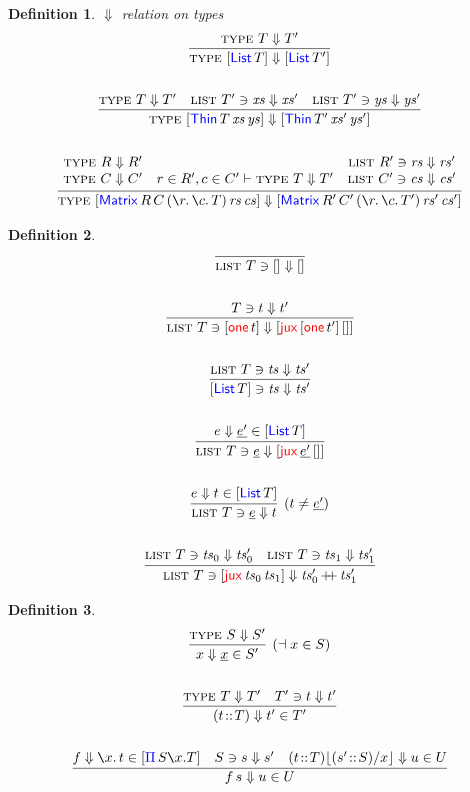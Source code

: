 \documentclass[12pt, a4paper]{article}
\makeatletter
\newcommand{\bsl}{\texttt{\symbol{92}}}
\newcommand{\Nil}{\mathbf{[]}}
\newcommand{\gp}{\,}
\newcommand{\forms}[3]{
  \ifthenelse{\equal{{#2}}{}}
  {\textcolor{#3}{\gp {#1}}}
  {[\textcolor{#3}{#1}\gp {#2}]}
}
\newcommand{\typeIntro}[2]{\forms{#1}{#2}{blue}}
\newcommand{\subst}[2]{{#1}\lfloor {#2} \rfloor}
\newcommand{\substfor}[3]{\subst{#1}{ {#2} / {#3} }}
\newcommand{\C}[1]{\textcolor{red}{\mathsf{#1}}}
\newcommand{\D}[1]{\textcolor{blue}{\mathsf{#1}}}
\newcommand{\one}[1]{[ \C{one} \gp  {#1} ]}
\newcommand{\List}[1]{[ \D{List} \gp {#1} ]}
\newcommand{\Matrix}[7]{[ \D{Matrix} \gp {#1} \gp {#2} \gp ( \la{#3}\la{#4} {#5}) \gp {#6} \gp {#7}]}
\newcommand{\MRCT}[2]{\Matrix{R}{C}{r}{c}{T}{#1}{#2}}
\newcommand{\jux}[2]{[ \C{jux} \gp {#1} \gp {#2}]}
\newcommand{\Thin}[3]{[ \D{Thin} \gp {#1} \gp {#2} \gp {#3} ]}
\newcommand{\synthType}[2]{{#1} \in {#2}}
\newcommand{\ctxSays}[1]{\dashv {#1}}
\newcommand{\rad}[2]{({#1} \!::\! {#2})}
\newcommand{\neu}[1]{\underline{#1}}
\newcommand{\la}[1]{\bsl{#1}.\,}
\newcommand{\V}[1]{\mathit{#1}}
\newcommand{\dplus}{\mathop{+\!\!+}}
\newcommand{\steps}{\Downarrow}
\newcommand{\typesteps}[2]{\textsc{type} \gp \gp {#1} \steps {#2}}
\newcommand{\liststeps}[3]{\textsc{list} \gp \gp {#1} \ni {#2} \steps {#3}}
\newcommand{\chksteps}[3]{{#1} \ni {#2} \steps {#3}}
\newcommand{\synsteps}[3]{{#1} \steps {#2} \in {#3}}
\newtheorem{dfn}{Definition}
\newcommand{\stackprem}[1]{
  \begin{array}[b]{@{}c@{}}
  #1
  \end{array}
}
\makeatother
\begin{document}
\begin{dfn} $\steps$ relation on types
  \begin{gather*}
   \infer{\typesteps{\List{T}}{\List{T'}}}{\typesteps{T}{T'}} \\ \\
   \infer
     {\typesteps{\Thin{T}{\V{xs}}{\V{ys}}}{\Thin{T'}{\V{xs'}}{\V{ys'}}}}
     {\typesteps{T}{T'}
       & \liststeps{T'}{\V{xs}}{\V{xs'}}
       & \liststeps{T'}{\V{ys}}{\V{ys'}}
     } \\ \\
   \infer
     {\typesteps{\MRCT{\V{rs}}{\V{cs}}}{\Matrix{R'}{C'}{r}{c}{T'}{\V{rs'}}{\V{cs'}}}}
     { \stackprem{\typesteps{R}{R'} \\ \typesteps{C}{C'}}
       & r \in R', c \in C' \vdash \typesteps{T}{T'}
       & \stackprem{
           \liststeps{R'}{\V{rs}}{\V{rs'}}\\
           \liststeps{C'}{\V{cs}}{\V{cs'}}
         }
     }
 \end{gather*}
\end{dfn}

\begin{dfn}
  \begin{gather*}
    \infer{\liststeps{T}{\Nil}{\Nil}}{} \\ \\
    \infer{\liststeps{T}{\one{t}}{\jux{\one{t'}}{\Nil}}}{\chksteps{T}{t}{t'}}\\ \\
    \infer{\chksteps{\List{T}}{\V{ts}}{\V{ts'}}}{\liststeps{T}{\V{ts}}{\V{ts'}}}\\ \\
    \infer{\liststeps{T}{\neu{e}}{\jux{\neu{e'}}{\Nil}}}{\synsteps{e}{\neu{e'}}{\List{T}}}\\ \\
    \infer[(t \neq \neu{e'})]{\liststeps{T}{\neu{e}}{t}}{\synsteps{e}{t}{\List{T}}}\\ \\
    \infer
    {\liststeps{T}{\jux{\V{ts}_{0}}{\V{ts}_{1}}}{\V{ts}'_{0} \dplus \V{ts}'_{1}}}
    {\liststeps{T}{\V{ts}_{0}}{\V{ts}'_{0}}
      &\liststeps{T}{\V{ts}_{1}}{\V{ts}'_{1}}}
  \end{gather*}
\end{dfn}

\begin{dfn}
  \begin{gather*}
    \infer[(\ctxSays{\synthType{x}{S}})]{\synsteps{x}{\neu{x}}{S'}}{\typesteps{S}{S'}}\\ \\
    \infer{\synsteps{\rad{t}{T}}{t'}{T'}}{\typesteps{T}{T'} & \chksteps{T'}{t}{t'}}\\ \\
    \infer
    {\synsteps{f \gp s}{u}{U}}
    {\synsteps{f}{\la{x} t}{\typeIntro{\Pi}{S \bsl x . T}}
      & \chksteps{S}{s}{s'}
    & \synsteps{\substfor{\rad{t}{T}}{\rad{s'}{S}}{x}}{u}{U} }
  \end{gather*}
\end{dfn}
\end{document}
